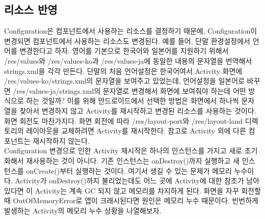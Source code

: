 \subsection{리소스 반영}
Configuration은 컴포넌트에서 사용하는 리소스를 결정하기 때문에,  Configuration이 변경되면 컴포넌트에서 사용하는 리소스도 변경된다. 예를 들어, 단말 환경설정에서 언어를 변경한다고 하자. 영어를 기본으로 한국어와 일본어를 지원하기 위해서 /res/values와 /res/values-ko과 /res/values-ja에 동일한 내용의 문자열을 번역해서 strings.xml을 각각 만든다. 단말의 처음 언어설정은 한국어여서 Activity 화면에 /res/values-ko/strings.xml의 문자열을 보여주고 있었는데, 언어설정을 일본어로 바꾸면 /res/values-ja/strings.xml의 문자열로 변경해서 화면에 보여줘야 하는데 어떤 방식으로 하는 것일까?
이를 위해 안드로이드에서 선택한 방법은 화면에서 하나씩 문자열을 찾아서 변경하지 않고 Activity를 재시작하고 변경된 리소스를 사용하는 것이다.
화면 회전도 마찬가지다. 화면 회전에 따라 /res/layout-port와 /res/layout-land 디렉토리의 레이아웃을 교체하려면 Activity를 재시작한다. 참고로 Activity 외에 다른 컴포넌트는 재시작하지 않는다.\\

Configuration 변경으로 인한 Activity 재시작은 하나의 인스턴스를 가지고 새로 초기화해서 재사용하는 것이 아니다. 기존 인스턴스는 onDestroy()까지 실행하고 새 인스턴스를 onCreate()부터 실행하는 것이다. 여기서 생길 수 있는 문제가 메모리 누수이다. Activity가 onDestroy()까지 불리었는데도 어느 곳에 Activity에 대한 참조가 남아있다면 이 Activity는 계속 GC 되지 않고 메모리를 차지하게 된다. 화면을 자꾸 회전할 때 OutOfMemoryError로 앱이 크래시된다면 원인은 메모리 누수 때문이다. 빈번하게 발생하는 Activity의 메모리 누수 상황을 나열해보자.

